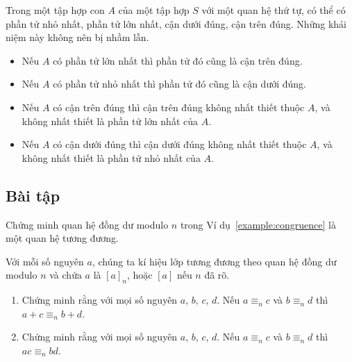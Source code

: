 Trong một tập hợp con $A$ của một tập hợp $S$ với một quan hệ thứ tự, có thể có phần tử nhỏ nhất, phần tử lớn nhất, cận dưới đúng, cận trên đúng. Những khái niệm này không nên bị nhầm lẫn.
\begin{itemize}
    \item Nếu $A$ có phần tử lớn nhất thì phần tử đó cũng là cận trên đúng.
    \item Nếu $A$ có phần tử nhỏ nhất thì phần tử đó cũng là cận dưới đúng.
    \item Nếu $A$ có cận trên đúng thì cận trên đúng không nhất thiết thuộc $A$, và không nhất thiết là phần tử lớn nhất của $A$.
    \item Nếu $A$ có cận dưới đúng thì cận dưới đúng không nhất thiết thuộc $A$, và không nhất thiết là phần tử nhỏ nhất của $A$.
\end{itemize}

\subsection{Bài tập}

\begin{exercise}
    Chứng minh quan hệ đồng dư modulo $n$ trong Ví dụ~\ref{example:congruence} là một quan hệ tương đương.
\end{exercise}

\begin{exercise}\label{exercise:sum-and-product-and-congruence}
    Với mỗi số nguyên $a$, chúng ta kí hiệu lớp tương đương theo quan hệ đồng dư modulo $n$ và chứa $a$ là ${[a]}_{n}$, hoặc $[a]$ nếu $n$ đã rõ.
    \begin{enumerate}[label={(\roman*)}]
        \item Chứng minh rằng với mọi số nguyên $a$, $b$, $c$, $d$. Nếu $a\equiv_{n} c$ và $b\equiv_{n} d$ thì $a + c \equiv_{n} b + d$.
        \item Chứng minh rằng với mọi số nguyên $a$, $b$, $c$, $d$. Nếu $a\equiv_{n} c$ và $b\equiv_{n} d$ thì $ac \equiv_{n} bd$.
    \end{enumerate}
\end{exercise}

